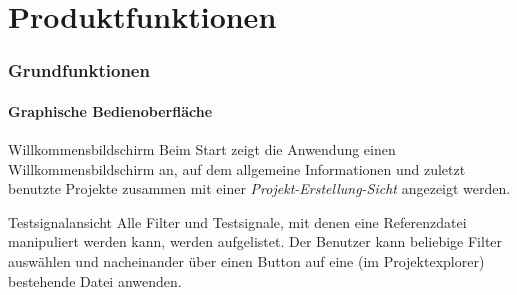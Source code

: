 \chapter {Produktfunktionen}

\subsection{Grundfunktionen}
\setcounter{counterKriterien}{0}

\subsubsection{Graphische Bedienoberfläche}
 Willkommensbildschirm
\newline
Beim Start zeigt die Anwendung einen Willkommensbildschirm an, auf dem allgemeine Informationen und zuletzt
 benutzte Projekte zusammen mit einer \emph{Projekt-Erstellung-Sicht} angezeigt werden.
 
 Testsignalansicht
\newline
Alle Filter und Testsignale, mit denen eine Referenzdatei manipuliert werden kann, werden aufgelistet. Der
 Benutzer kann beliebige Filter auswählen und nacheinander über einen Button auf eine (im Projektexplorer)
 bestehende Datei anwenden.

